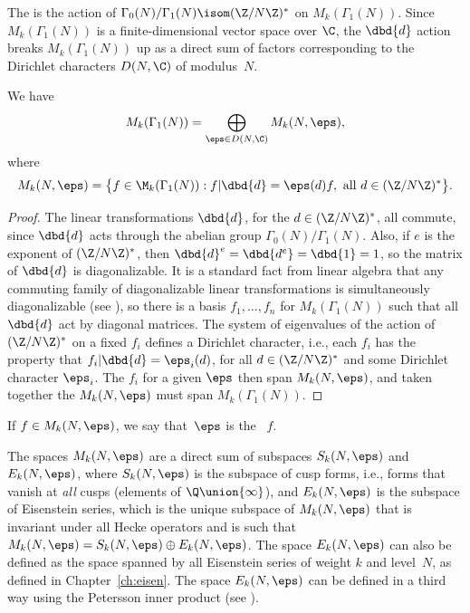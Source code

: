The  is the action of
$\Gamma_0(N)/\Gamma_1(N)\isom(\Z/N\Z)^*$ on $M_k(\Gamma_1(N))$.  Since
$M_k(\Gamma_1(N))$ is a finite-dimensional vector space over $\C$, the
$\dbd{d}$ action breaks $M_k(\Gamma_1(N))$ up as a direct sum of
factors corresponding to the Dirichlet characters $D(N,\C)$ of
modulus~$N$.
\begin{proposition}\label{prop:dcdecomp}
We have
$$
  M_k(\Gamma_1(N)) = \bigoplus_{\eps \in D(N,\C)} M_k(N,\eps),
$$
where
$$
  M_k(N,\eps) = \bigl\{ f \in \M_k(\Gamma_1(N)) : f|\dbd{d} = \eps(d) f,
                    \text{ all }d \in (\Z/N\Z)^*\bigr\}.
$$
\end{proposition}
\begin{proof}
  The linear transformations $\dbd{d}$, for the $d\in(\Z/N\Z)^*$, all
  commute, since $\dbd{d}$ acts through the abelian group
  $\Gamma_0(N)/\Gamma_1(N)$.  Also, if $e$ is the exponent of
  $(\Z/N\Z)^*$, then $\dbd{d}^e = \dbd{d^e} = \dbd{1} = 1$, so the
  matrix of $\dbd{d}$ is diagonalizable.  It is a standard fact from
  linear algebra that any commuting family of diagonalizable linear
  transformations is simultaneously diagonalizable (see
  ), so there is a basis $f_1,\ldots, f_n$
  for $M_k(\Gamma_1(N))$ such that all $\dbd{d}$ act by diagonal
  matrices.  The system of eigenvalues of the action of $(\Z/N\Z)^*$ on a fixed
  $f_i$ defines a Dirichlet character, i.e., each $f_i$ has
  the property that $f_i |\dbd{d} = \eps_i(d)$, for all
  $d\in(\Z/N\Z)^*$ and some Dirichlet character $\eps_i$.  The $f_i$
  for a given $\eps$ then span $M_k(N,\eps)$, and taken together the
  $M_k(N,\eps)$ must span $M_k(\Gamma_1(N))$.
\end{proof}

\begin{definition}
If $f\in M_k(N,\eps)$, we say that~$\eps$ is 
the ~$f$.
\end{definition}

The spaces $M_k(N,\eps)$ are a direct sum of subspaces
$S_k(N,\eps)$ and $E_k(N,\eps)$, where $S_k(N,\eps)$ is the
subspace of cusp forms, i.e., forms that vanish at {\em all}
cusps (elements of $\Q \union \{\infty\}$), and $E_k(N,\eps)$
is the subspace of Eisenstein series, which is the unique
subspace of $M_k(N,\eps)$ that is invariant under all Hecke
operators and is such that 
$M_k(N,\eps) = S_k(N,\eps) \oplus E_k(N,\eps)$.
The space $E_k(N,\eps)$ can also be defined as the space
spanned by all Eisenstein series of weight $k$ and level~$N$,
as defined in Chapter~\ref{ch:eisen}. The space 
$E_k(N,\eps)$ can be defined in a third way using the Petersson
inner product (see \cite[\S{}VII.5]{lang:modular}).

